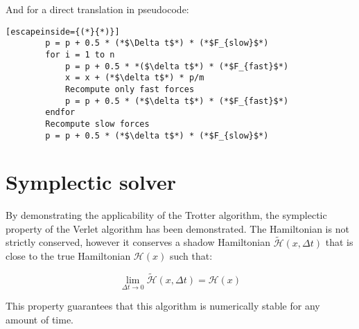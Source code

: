 	And for a direct translation in pseudocode:

	\begin{lstlisting}[escapeinside={(*}{*)}]
		p = p + 0.5 * (*$\Delta t$*) * (*$F_{slow}$*)
		for i = 1 to n
			p = p + 0.5 * *($\delta t$*) * (*$F_{fast}$*)
			x = x + (*$\delta t$*) * p/m
			Recompute only fast forces
			p = p + 0.5 * (*$\delta t$*) * (*$F_{fast}$*)
		endfor
		Recompute slow forces
		p = p + 0.5 * (*$\delta t$*) * (*$F_{slow}$*)
	\end{lstlisting}

\section{Symplectic solver}
By demonstrating the applicability of the Trotter algorithm, the symplectic property of the Verlet algorithm has been demonstrated.
The Hamiltonian is not strictly conserved, however it conserves a shadow Hamiltonian $\tilde{\mathcal{H}}(x, \Delta t)$ that is close to the true Hamiltonian $\mathcal{H}(x)$ such that:

$$\lim\limits_{\Delta t\rightarrow 0}\tilde{\mathcal{H}}(x, \Delta t) = \mathcal{H}(x)$$

This property guarantees that this algorithm is numerically stable for any amount of time.
